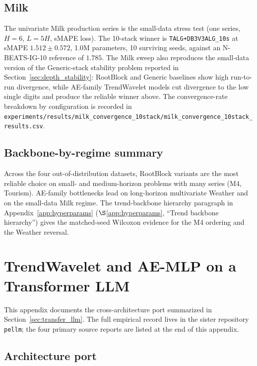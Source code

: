 \documentclass{article}
\begin{document}
\subsection{Milk}

\begin{sloppypar}
The univariate Milk production series is the small-data stress test (one series, $H=6$, $L=5H$, sMAPE loss). The 10-stack winner is \texttt{TALG+DB3V3ALG\_10s} at sMAPE $1.512 \pm 0.572$, 1.0M parameters, 10 surviving seeds, against an N-BEATS-IG-10 reference of $1.785$. The Milk sweep also reproduces the small-data version of the Generic-stack stability problem reported in Section~\ref{sec:depth_stability}: RootBlock and Generic baselines show high run-to-run divergence, while AE-family TrendWavelet models cut divergence to the low single digits and produce the reliable winner above. The convergence-rate breakdown by configuration is recorded in \nolinkurl{experiments/results/milk_convergence_10stack/milk_convergence_10stack_results.csv}.
\end{sloppypar}

\subsection{Backbone-by-regime summary}

Across the four out-of-distribution datasets, RootBlock variants are the most reliable choice on small- and medium-horizon problems with many series (M4, Tourism). AE-family bottlenecks lead on long-horizon multivariate Weather and on the small-data Milk regime. The trend-backbone hierarchy paragraph in Appendix~\ref{app:hyperparams} ($\S$\ref{app:hyperparams}, ``Trend backbone hierarchy'') gives the matched-seed Wilcoxon evidence for the M4 ordering and the Weather reversal.

\section{TrendWavelet and AE-MLP on a Transformer LLM}
\label{app:llm_transfer}

This appendix documents the cross-architecture port summarized in Section~\ref{sec:transfer_llm}. The full empirical record lives in the sister repository \texttt{pellm}; the four primary source reports are listed at the end of this appendix.

\subsection{Architecture port}
\end{document}
